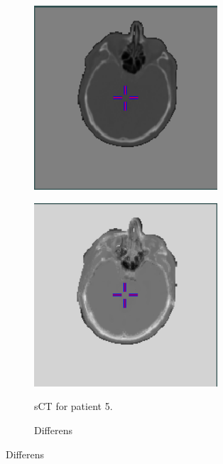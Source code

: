 \begin{figure}
\begin{subfigure}[b]{0.3\textwidth}
        \includegraphics[width=0.75\textwidth]{colager/loocv_ct/loocv_011030_ct.png}
        \label{col:loocv_ct_pat5_ct}
    \end{subfigure}\hfill
    \begin{subfigure}[b]{0.3\textwidth}
        \caption{sCT for patient 5.}
        \includegraphics[width=0.75\textwidth]{colager/loocv_ct/loocv_011030_sct.png}
        \label{col:loocv_ct_pat5_sct}
    \end{subfigure}\hfill
    \begin{subfigure}[b]{0.3\textwidth}
        \caption{Differens}

\end{subfigure}
\end{figure}

